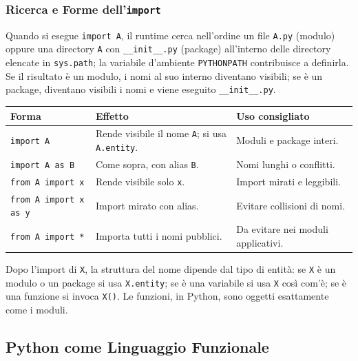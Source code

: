 \documentclass[12pt]{extarticle}
\begin{document}
\subsubsection{Ricerca e Forme dell'\texttt{import}}

{\sloppy
\noindent Quando si esegue \texttt{import A}, il runtime cerca nell'ordine un file \texttt{A.py} (modulo) oppure una directory \texttt{A} con \texttt{\_\_init\_\_.py} (package) all'interno delle directory elencate in \texttt{sys.path}; la variabile d'ambiente \texttt{PYTHONPATH} contribuisce a definirla. Se il risultato è un modulo, i nomi al suo interno diventano visibili; se è un package, diventano visibili i nomi e viene eseguito \texttt{\_\_init\_\_.py}.\par}

\begin{center}
\small
\begin{tabular}{p{4.6cm}p{5.0cm}p{5.2cm}}
    \toprule
    \textbf{Forma} & \textbf{Effetto} & \textbf{Uso consigliato} \\
    \midrule
    \texttt{import A} & Rende visibile il nome \texttt{A}; si usa \texttt{A.entity}. & Moduli e package interi. \\
    \addlinespace
    \texttt{import A as B} & Come sopra, con alias \texttt{B}. & Nomi lunghi o conflitti. \\
    \addlinespace
    \texttt{from A import x} & Rende visibile solo \texttt{x}. & Import mirati e leggibili. \\
    \addlinespace
    \texttt{from A import x as y} & Import mirato con alias. & Evitare collisioni di nomi. \\
    \addlinespace
    \texttt{from A import *} & Importa tutti i nomi pubblici. & Da evitare nei moduli applicativi. \\
    \bottomrule
\end{tabular}
\end{center}

\noindent Dopo l'import di \texttt{X}, la struttura del nome dipende dal tipo di entità: se \texttt{X} è un modulo o un package si usa \texttt{X.entity}; se è una variabile si usa \texttt{X} così com'è; se è una funzione si invoca \texttt{X()}. Le funzioni, in Python, sono oggetti esattamente come i moduli.

\subsection{Python come Linguaggio Funzionale}
\end{document}

